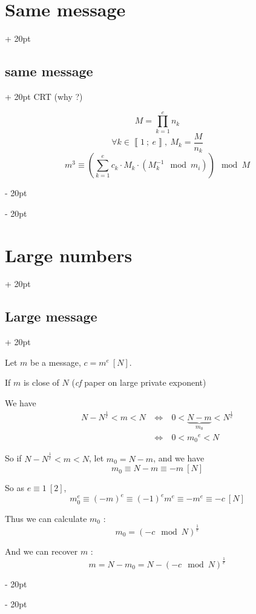 \documentclass[a4paper, 12pt, twoside]{article}
\newcommand{\nset}[2]{\left\llbracket #1\ ;\ #2 \right\rrbracket}
\newcommand{\lr}[1]{\left( #1 \right)}
\newcommand{\ssi}{\ \Leftrightarrow \ }
\newcommand{\ind}[1][20pt]{\advance\leftskip + #1}
\newcommand{\deind}[1][20pt]{\advance\leftskip - #1}
\newenvironment{indt}[2][20pt]{#2 \par \ind[#1]}{\par \deind} %
\begin{document}
\begin{indt}{\section{Same message}}
\begin{indt}{\subsection{same message}}
            CRT (why ?)

            \[
                M = \prod_{k = 1}^e n_k
            \]
            \[
                \forall k \in \nset 1 e,\ M_k = \dfrac M {n_k}
            \]
            \[
                m^3 \equiv \lr{\sum_{k = 1}^e c_k \cdot M_k \cdot (M_k^{-1} \mod m_i)} \mod M
            \]
        \end{indt}
    \end{indt}

    \vspace{12pt}
    
    \begin{indt}{\section{Large numbers}}
        \begin{indt}{\subsection{Large message}}
            \label{largeMessage}

            Let $m$ be a message, $c = m^e\ [N]$.

            If $m$ is close of $N$ (\textit{cf} paper on large private exponent)

            We have
            \[
                \begin{array}{rcl}
                    N - N^{\tfrac 1 e} < m < N
                    &\ssi& 0 < \underbrace{N - m}_{m_0} < N^{\tfrac 1 e}
                    \\
                    &\ssi& 0 < {m_0}^e < N
                \end{array}
            \]

            So if $N - N^{\tfrac 1 e} < m < N$, let $m_0 = N - m$, and we have
            \[
                m_0 \equiv N - m \equiv -m\ [N]
            \]

            So as $e \equiv 1\ [2]$,
            \[
                m_0^e \equiv (-m)^e \equiv (-1)^e m^e \equiv -m^e \equiv -c\ [N]
            \]

            Thus we can calculate $m_0$ :
            \[
                m_0 = \lr{-c \mod N}^{\tfrac 1 e}
            \]

            And we can recover $m$ :
            \[
                m = N - m_0 = N - \lr{-c \mod N}^{\tfrac 1 e}
            \]
        \end{indt}
    \end{indt}
\end{document}

